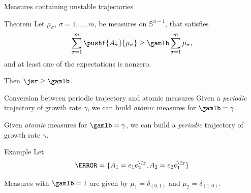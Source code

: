 \documentclass{beamer}
\begin{document}
  \begin{frame}{Measures containing unstable trajectories}
      \begin{block}{Theorem}
          Let $\mu_{\sigma}$, $\sigma=1, \ldots, m$, be measures on $\mathbb{S}^{n-1}$,
          that satisfies
          \[ \sum_{\sigma = 1}^m \pushf{A_\sigma}{\mu_\sigma} \geq \gamlb \sum_{\sigma = 1}^m \mu_\sigma, \]
          and at least one of the expectations is nonzero.

          Then  $\jsr \geq \gamlb$.
      \end{block}
  \end{frame}


  \begin{frame}{Conversion between periodic trajectory and atomic measures}
      Given a \emph{periodic} trajectory of growth rate $\gamma$,
      we can build \emph{atomic} measures for $\gamlb = \gamma$.

      Given \emph{atomic} measures for $\gamlb = \gamma$,
      we can build a \emph{periodic} trajectory of growth rate $\gamma$.

      \begin{block}{Example}
      Let
      \[ \A = \{ A_1 = e_1e_2^\Tr , A_2 = e_2e_1^\Tr  \} \]


      Measures with $\gamlb = 1$ are given by $\mu_1 = \delta_{(0,1)}$ and $\mu_2 = \delta_{(1,0)}$.

      \begin{center}
\end{center}
\end{block}
\end{frame}
\end{document}
